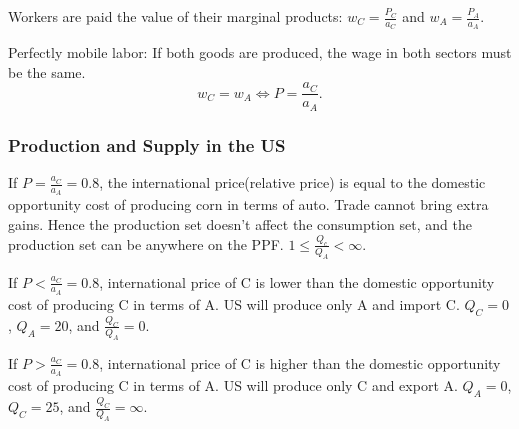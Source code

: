 Workers are paid the value of their marginal products: $w_C = \frac{P_C}{a_C}$ and $w_A = \frac{P_A}{a_A}$.

Perfectly mobile labor: If both goods are produced, the wage in both sectors must be the same.
\[w_C = w_A \Leftrightarrow P = \frac{a_C}{a_A}.\]

\subsubsection{Production and Supply in the US}

If $P = \frac{a_C}{a_A} = 0.8$, the international price(relative price) is equal to the domestic opportunity cost of producing corn in terms of auto.
Trade cannot bring extra gains. Hence the production set doesn't affect the consumption set, and the production set can be anywhere on the PPF. $1 \leq \frac{Q_c}{Q_A} < \infty$. 

If $P < \frac{a_C}{a_A} = 0.8$, international price of C is lower than the domestic opportunity cost of producing C in terms of A. 
US will produce only A and import C. 
$Q_C = 0$, $Q_A = 20$, and $\frac{Q_C}{Q_A} = 0$.

If $P > \frac{a_C}{a_A} = 0.8$, international price of C is higher than the domestic opportunity cost of producing C in terms of A. 
US will produce only C and export A.
$Q_A = 0$, $Q_C = 25$, and $\frac{Q_C}{Q_A} = \infty$.

\begin{center}
\end{center}

